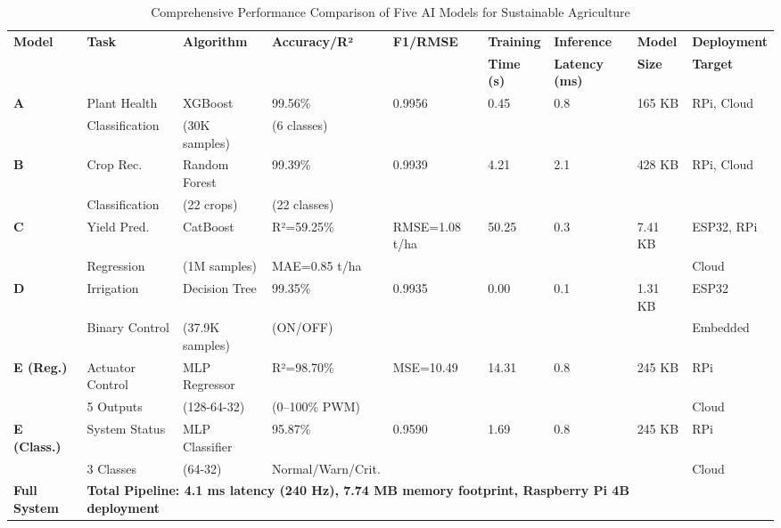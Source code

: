 \documentclass[conference]{IEEEtran}
\begin{document}
\begin{table}[!t]
\caption{Comprehensive Performance Comparison of Five AI Models for Sustainable Agriculture}
\centering
\footnotesize
\begin{tabular}{@{}lllllllll@{}}
\hline
\textbf{Model} & \textbf{Task} & \textbf{Algorithm} & \textbf{Accuracy/R²} & \textbf{F1/RMSE} & \textbf{Training} & \textbf{Inference} & \textbf{Model} & \textbf{Deployment} \\
 &  &  &  &  & \textbf{Time (s)} & \textbf{Latency (ms)} & \textbf{Size} & \textbf{Target} \\
\hline
\textbf{A} & Plant Health & XGBoost & 99.56\% & 0.9956 & 0.45 & 0.8 & 165 KB & RPi, Cloud \\
 & Classification & (30K samples) & (6 classes) & & & & & \\
\hline
\textbf{B} & Crop Rec. & Random Forest & 99.39\% & 0.9939 & 4.21 & 2.1 & 428 KB & RPi, Cloud \\
 & Classification & (22 crops) & (22 classes) & & & & & \\
\hline
\textbf{C} & Yield Pred. & CatBoost & R²=59.25\% & RMSE=1.08 t/ha & 50.25 & 0.3 & 7.41 KB & ESP32, RPi \\
 & Regression & (1M samples) & MAE=0.85 t/ha & & & & & Cloud \\
\hline
\textbf{D} & Irrigation & Decision Tree & 99.35\% & 0.9935 & 0.00 & 0.1 & 1.31 KB & ESP32 \\
 & Binary Control & (37.9K samples) & (ON/OFF) & & & & & Embedded \\
\hline
\textbf{E (Reg.)} & Actuator Control & MLP Regressor & R²=98.70\% & MSE=10.49 & 14.31 & 0.8 & 245 KB & RPi \\
 & 5 Outputs & (128-64-32) & (0--100\% PWM) & & & & & Cloud \\
\hline
\textbf{E (Class.)} & System Status & MLP Classifier & 95.87\% & 0.9590 & 1.69 & 0.8 & 245 KB & RPi \\
 & 3 Classes & (64-32) & Normal/Warn/Crit. & & & & & Cloud \\
\hline
\textbf{Full System} & \multicolumn{7}{l}{\textbf{Total Pipeline: 4.1 ms latency (240 Hz), 7.74 MB memory footprint, Raspberry Pi 4B deployment}} \\
\hline
\end{tabular}
\label{tab:comprehensive_comparison}
\end{table}
\end{document}
